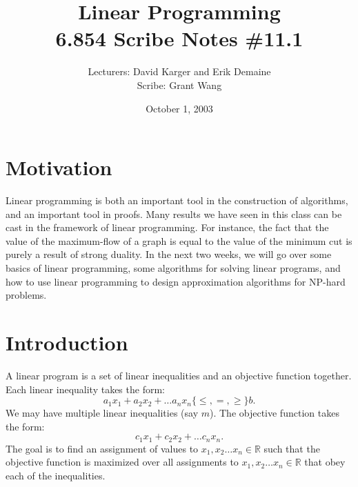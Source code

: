 \documentclass{article}
\title{Linear Programming\\ 6.854 Scribe Notes \#11.1}
\date{October 1, 2003}
\author{Lecturers: David Karger and Erik Demaine\\ Scribe: Grant Wang}
\newcommand{\reals}{\mathbb{R}}
\begin{document}
%
%
%
%

%



\section{Motivation}

Linear programming is both an important tool in the construction of
algorithms, and an important tool in proofs.  Many results we have
seen in this class can be cast in the framework of linear programming.
For instance, the fact that the value of the maximum-flow of a graph
is equal to the value of the minimum cut is purely a result of strong
duality.  In the next two weeks, we will go over some basics of linear
programming, some algorithms for solving linear programs, and how to
use linear programming to design approximation algorithms for NP-hard
problems.

\section{Introduction}

A linear program is a set of linear inequalities and an objective
function together.  Each linear inequality takes the form:
$$a_1 x_1 + a_2 x_2 + \dots a_n x_n \{\leq,=,\geq \} b.$$
We may have
multiple linear inequalities (say $m$).  The objective function takes
the form:
$$c_1 x_1 + c_2 x_2 + \dots c_n x_n.$$
The goal is to find an
assignment of values to $x_1, x_2 \dots x_n \in \reals$ such that the
objective function is maximized over all assignments to $x_1, x_2
\dots x_n \in \reals$ that obey each of the inequalities.
\end{document}
